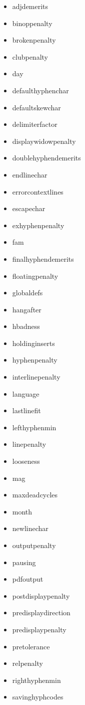 \begin{itemize}
  \item adjdemerits
  \item binoppenalty
  \item brokenpenalty
  \item clubpenalty
  \item day
  \item defaulthyphenchar
  \item defaultskewchar
  \item delimiterfactor
  \item displaywidowpenalty
  \item doublehyphendemerits
  \item endlinechar
  \item errorcontextlines
  \item escapechar
  \item exhyphenpenalty
  \item fam
  \item finalhyphendemerits
  \item floatingpenalty
  \item globaldefs
  \item hangafter
  \item hbadness
  \item holdinginserts
  \item hyphenpenalty
  \item interlinepenalty
  \item language
  \item lastlinefit
  \item lefthyphenmin
  \item linepenalty
  \item looseness
  \item mag
  \item maxdeadcycles
  \item month
  \item newlinechar
  \item outputpenalty
  \item pausing
  \item pdfoutput
  \item postdisplaypenalty
  \item predisplaydirection
  \item predisplaypenalty
  \item pretolerance
  \item relpenalty
  \item righthyphenmin
  \item savinghyphcodes

\end{itemize}
